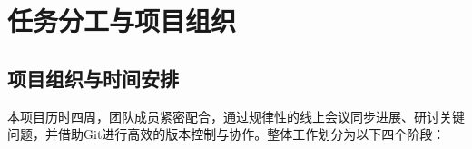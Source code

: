 \documentclass[12pt,a4paper]{article}
\begin{document}


\clearpage
{}
{}
\renewcommand{\bibname}{参考文献}
\nocite{*}


\clearpage
{}
{}
\appendix
\section{任务分工与项目组织}
\subsection{项目组织与时间安排}

本项目历时四周，团队成员紧密配合，通过规律性的线上会议同步进展、研讨关键问题，并借助Git进行高效的版本控制与协作。整体工作划分为以下四个阶段：
\end{document}
